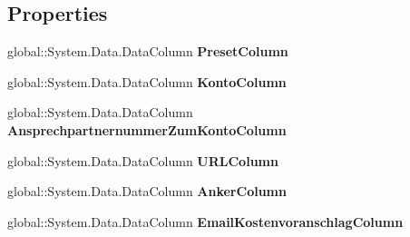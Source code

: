 \subsection*{Properties}
\begin{DoxyCompactItemize}
\item 
global\+::\+System.\+Data.\+Data\+Column {\bfseries Preset\+Column}\hypertarget{class_products_1_1_data_1_1ds_sage_1_1kontaktemail_data_table_a7060447f5b739cae2e61a0fd24e9f590}{}\label{class_products_1_1_data_1_1ds_sage_1_1kontaktemail_data_table_a7060447f5b739cae2e61a0fd24e9f590}

\item 
global\+::\+System.\+Data.\+Data\+Column {\bfseries Konto\+Column}\hypertarget{class_products_1_1_data_1_1ds_sage_1_1kontaktemail_data_table_ab0c69bf3ec09ae7dd22975eb3a8e00c1}{}\label{class_products_1_1_data_1_1ds_sage_1_1kontaktemail_data_table_ab0c69bf3ec09ae7dd22975eb3a8e00c1}

\item 
global\+::\+System.\+Data.\+Data\+Column {\bfseries Ansprechpartnernummer\+Zum\+Konto\+Column}\hypertarget{class_products_1_1_data_1_1ds_sage_1_1kontaktemail_data_table_a3a986237c1ac7e67d4216489071247d7}{}\label{class_products_1_1_data_1_1ds_sage_1_1kontaktemail_data_table_a3a986237c1ac7e67d4216489071247d7}

\item 
global\+::\+System.\+Data.\+Data\+Column {\bfseries U\+R\+L\+Column}\hypertarget{class_products_1_1_data_1_1ds_sage_1_1kontaktemail_data_table_a0dc5bfec0f22d468bbd192528582cb92}{}\label{class_products_1_1_data_1_1ds_sage_1_1kontaktemail_data_table_a0dc5bfec0f22d468bbd192528582cb92}

\item 
global\+::\+System.\+Data.\+Data\+Column {\bfseries Anker\+Column}\hypertarget{class_products_1_1_data_1_1ds_sage_1_1kontaktemail_data_table_a4c620d73605d9ea62131a57690062a49}{}\label{class_products_1_1_data_1_1ds_sage_1_1kontaktemail_data_table_a4c620d73605d9ea62131a57690062a49}

\item 
global\+::\+System.\+Data.\+Data\+Column {\bfseries Email\+Kostenvoranschlag\+Column}\hypertarget{class_products_1_1_data_1_1ds_sage_1_1kontaktemail_data_table_ad91b56391f1bbaa587e5d3b463305b66}{}\label{class_products_1_1_data_1_1ds_sage_1_1kontaktemail_data_table_ad91b56391f1bbaa587e5d3b463305b66}


\end{DoxyCompactItemize}
